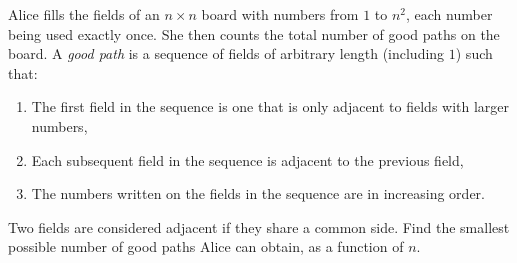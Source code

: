 Alice fills the fields of an $n \times n$ board with numbers from $1$ to $n^2$, each number being used exactly once. She then counts the total number of good paths on the board. A \emph{good path} is a sequence of fields of arbitrary length (including $1$) such that:
\begin{enumerate}
\item[(i)] The first field in the sequence is one that is only adjacent to fields with larger numbers,
\item[(ii)] Each subsequent field in the sequence is adjacent to the previous field,
\item[(iii)] The numbers written on the fields in the sequence are in increasing order.
\end{enumerate}
Two fields are considered adjacent if they share a common side. Find the smallest possible number of good paths Alice can obtain, as a function of $n$.
